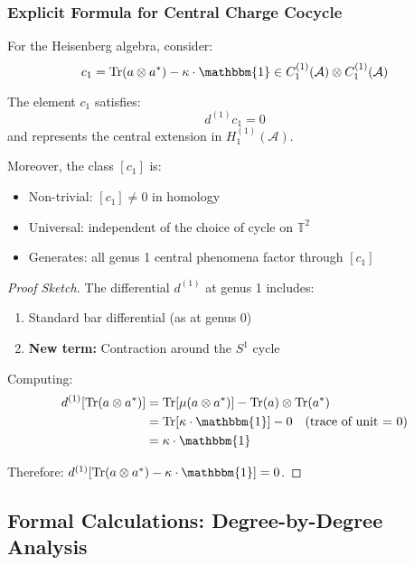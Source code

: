\subsubsection{Explicit Formula for Central Charge Cocycle}

For the Heisenberg algebra, consider:
$$c_1 = \operatorname{Tr}(a \otimes a^*) - \kappa \cdot \mathbbm{1} 
\in C_1^{(1)}(\mathcal{A}) \otimes C_1^{(1)}(\mathcal{A})$$

\begin{theorem}
The element $c_1$ satisfies:
$$d^{(1)} c_1 = 0$$
and represents the central extension in $H_1^{(1)}(\mathcal{A})$.

Moreover, the class $[c_1]$ is:
\begin{itemize}
\item Non-trivial: $[c_1] \neq 0$ in homology
\item Universal: independent of the choice of cycle on $\mathbb{T}^2$
\item Generates: all genus 1 central phenomena factor through $[c_1]$
\end{itemize}
\end{theorem}

\begin{proof}[Proof Sketch]
The differential $d^{(1)}$ at genus 1 includes:
\begin{enumerate}
\item Standard bar differential (as at genus 0)
\item \textbf{New term:} Contraction around the $S^1$ cycle
\end{enumerate}

Computing:
\begin{align}
d^{(1)}[\operatorname{Tr}(a \otimes a^*)] 
&= \operatorname{Tr}[\mu(a \otimes a^*)] - \operatorname{Tr}(a) \otimes \operatorname{Tr}(a^*) \\
&= \operatorname{Tr}[\kappa \cdot \mathbbm{1}] - 0 \quad \text{(trace of unit = 0)} \\
&= \kappa \cdot \mathbbm{1}
\end{align}

Therefore: $d^{(1)}[\operatorname{Tr}(a \otimes a^*) - \kappa \cdot \mathbbm{1}] = 0$.
\end{proof}

\subsection{Formal Calculations: Degree-by-Degree Analysis}


